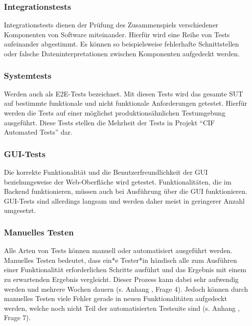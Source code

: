 \subsubsection*{Integrationstests} \label{subsubsec:integrationstests}
Integrationstests dienen der Prüfung des Zusammenspiels verschiedener Komponenten von Software miteinander. Hierfür wird eine Reihe von Tests aufeinander abgestimmt. Es können so beispielsweise fehlerhafte Schnittstellen oder falsche Dateninterpretationen zwischen Komponenten aufgedeckt werden. \cite[S. 76]{witte:2019}

\subsubsection*{Systemtests}\label{subsubsec:e2etests}
Werden auch als \ac{E2E}-Tests bezeichnet. Mit diesen Tests wird das gesamte \ac{SUT} auf bestimmte funktionale und nicht funktionale Anforderungen getestet. Hierfür werden die Tests auf einer möglichst produktionsähnlichen Testumgebung ausgeführt. \cite[S. 78f.]{witte:2019} Diese Tests stellen die Mehrheit der Tests in Projekt \enquote{CIF Automated Tests} dar.

\subsubsection*{GUI-Tests}\label{subsubsec:guitests}
Die korrekte Funktionalität und die Benutzerfreundlichkeit der \ac{GUI} beziehungsweise der Web-Oberfläche wird getestet. Funktionalitäten, die im Backend funktionieren, müssen auch bei Ausführung über die \ac{GUI} funktionieren. \cite{bruns:2009} \ac{GUI}-Tests sind allerdings langsam und werden daher meist in geringerer Anzahl umgesetzt. \cite{contan:2018}

\subsubsection*{Manuelles Testen}\label{subsubsec:manuelltest}
Alle Arten von Tests können manuell oder automatisiert ausgeführt werden. Manuelles Testen bedeutet, dass ein*e Tester*in händisch alle zum Ausführen einer Funktionalität erforderlichen Schritte ausführt und das Ergebnis mit einem zu erwartenden Ergebnis vergleicht. Dieser Prozess kann dabei sehr aufwendig werden und mehrere Wochen dauern (s. Anhang , Frage 4). Jedoch können durch manuelles Testen viele Fehler gerade in neuen Funktionalitäten aufgedeckt werden, welche noch nicht Teil der automatisierten Testsuite sind \cite[S. 231]{witte:2019} (s. Anhang , Frage 7).

